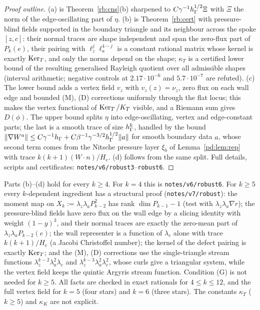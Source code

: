 \begin{proof}[Proof outline]
(a) is Theorem~\ref{rb:cns}(b) sharpened to $C\gamma^{-1}h_\Gamma^{1/2}\Xi$ with $\Xi$ the norm of the edge-oscillating part of $\eta$. (b) is Theorem~\ref{rb:cert} with pressure-blind fields supported in the boundary triangle and its neighbour across the spoke $[z,c]$: their normal traces are shape independent and span the zero-flux part of $P_k(e)$, their pairing with $\ell_z^j\ell_a^{4-j}$ is a constant rational matrix whose kernel is exactly $\operatorname{Ker}_T$, and only the norms depend on the shape; $\kappa_T$ is a certified lower bound of the resulting generalised Rayleigh quotient over all admissible shapes (interval arithmetic; negative controls at $2.17\cdot10^{-6}$ and $5.7\cdot10^{-7}$ are refuted). (c) The lower bound adds a vertex field $v_z$ with $v_z(z)=\nu_z$, zero flux on each wall edge and bounded (M), (D) corrections uniformly through the flat locus; this makes the vertex functional of $\operatorname{Ker}_T/K_T$ visible, and a Riemann sum gives $D(\phi)$. The upper bound splits $\eta$ into edge-oscillating, vertex and edge-constant parts; the last is a smooth trace of size $h_\Gamma^k$, handled by the bound $\lVert \nabla W^a\rVert\le C\gamma^{-1}h_\Gamma+C\beta^{-1}\gamma^{-3/2}h_\Gamma^{1/2}\lVert a\rVert$ for smooth boundary data $a$, whose second term comes from the Nitsche pressure layer $\xi_b$ of Lemma~\ref{pd:lem:rep} with trace $k(k+1)(W\cdot n)/H_e$. (d) follows from the same split. Full details, scripts and certificates: \texttt{notes/v6/robust3}--\texttt{robust6}.
\end{proof}

Parts (b)--(d) hold for every $k\ge4$. For $k=4$ this is \texttt{notes/v6/robust6}. For $k\ge5$ every $k$-dependent ingredient has a structural proof (\texttt{notes/v7/robust}): the moment map on $X_k:=\lambda_z\lambda_aP_{k-2}^2$ has rank $\dim P_{k-1}-1$ (test with $\lambda_z\lambda_a\nabla r$); the pressure-blind fields have zero flux on the wall edge by a slicing identity with weight $(1-y)^3$, and their normal traces are exactly the zero-mean part of $\lambda_z\lambda_aP_{k-2}(e)$; the wall representer is a function of $\lambda_c$ alone with trace $k(k+1)/H_e$ (a Jacobi Christoffel number); the kernel of the defect pairing is exactly $\operatorname{Ker}_T$; and the (M), (D) corrections use the single-triangle stream functions $\lambda_z^{k-2}\lambda_a^2\lambda_c$ and $\lambda_z^{k-3}\lambda_a^2\lambda_c^2$, whose curls give a triangular system, while the vertex field keeps the quintic Argyris stream function. Condition (G) is not needed for $k\ge5$. All facts are checked in exact rationals for $4\le k\le12$, and the full vertex field for $k=5$ (four stars) and $k=6$ (three stars). The constants $\kappa_T$ ($k\ge5$) and $\kappa_K$ are not explicit.

